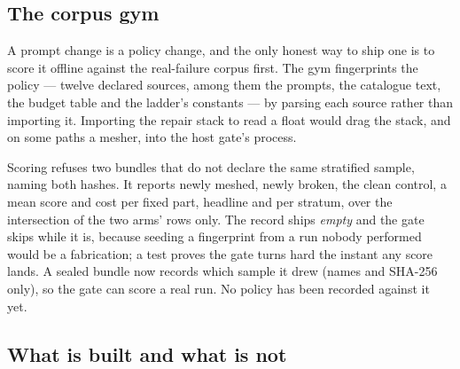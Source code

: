 \documentclass[11pt,onecolumn]{article}
\begin{document}
\subsection{The corpus gym}\label{sec:gym}

A prompt change is a policy change, and the only honest way to ship one is to score it offline
against the real-failure corpus first. The gym fingerprints the policy --- twelve declared sources,
among them the prompts, the catalogue text, the budget table and the ladder's constants --- by
parsing each source rather than importing it. Importing the repair stack to read a float would drag
the stack, and on some paths a mesher, into the host gate's process.

Scoring refuses two bundles that do not declare the same stratified sample, naming both hashes. It
reports newly meshed, newly broken, the clean control, a mean score and cost per fixed part,
headline and per stratum, over the intersection of the two arms' rows only. The record ships
\emph{empty} and the gate skips while it is, because seeding a fingerprint from a run nobody
performed would be a fabrication; a test proves the gate turns hard the instant any score lands.
A sealed bundle now records which sample it drew (names and SHA-256 only), so the gate can score
a real run. No policy has been recorded against it yet.

\subsection{What is built and what is not}\label{sec:v3status}
\end{document}
